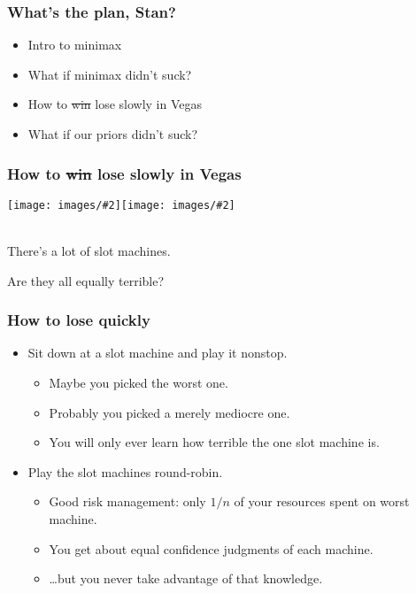 \documentclass[table]{beamer}
\newcommand\img[2]{\texttt{[image: images/\#2]}}
\begin{document}
\begin{frame}
	\frametitle{What's the plan, Stan?}
	\begin{itemize}
		\setlength\itemsep{5ex}
		\item Intro to minimax
		\item What if minimax didn't suck?
		\item \alert{How to \sout{win} lose slowly in Vegas}
		\item What if our priors didn't suck?
	\end{itemize}
\end{frame}

\begin{frame}
	\frametitle{How to \sout{win} lose slowly in Vegas}
	\begin{center}
		\img{0.4}{slot-machine-choice-1.png}\hfil\img{0.4}{slot-machine-choice-2.png}

		\\[5ex]

		There's a lot of slot machines.

		Are they all equally terrible?
	\end{center}
\end{frame}

\begin{frame}
	\frametitle{How to lose quickly}
	\begin{itemize}
		\item Sit down at a slot machine and play it nonstop.
			\begin{itemize}
				\item Maybe you picked the worst one.
				\item Probably you picked a merely mediocre one.
				\item You will only ever learn how terrible the one slot
					machine is.
			\end{itemize}
		\item Play the slot machines round-robin.
			\begin{itemize}
				\item Good risk management: only $1/n$ of your resources
					spent on worst machine.
				\item You get about equal confidence judgments of each
					machine.
				\item \ldots{}but you never take advantage of that
					knowledge.
			\end{itemize}
	\end{itemize}
\end{frame}
\end{document}
